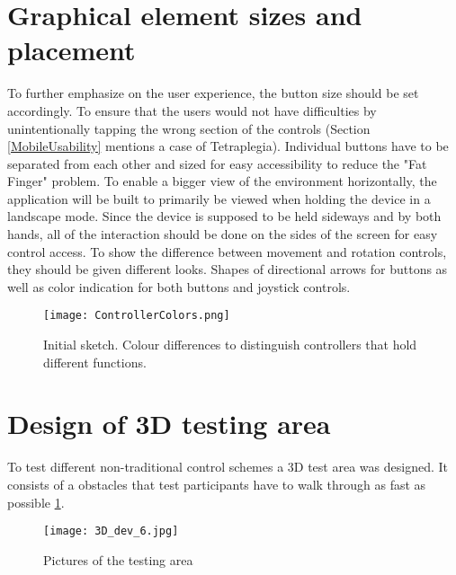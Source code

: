 \section{Graphical element sizes and placement}
To further emphasize on the user experience, the button size should be set accordingly. To ensure that the users would not have difficulties by unintentionally tapping the wrong section of the controls (Section \ref{MobileUsability} mentions a case of Tetraplegia). Individual buttons have to be separated from each other and sized for easy accessibility to reduce the "Fat Finger" problem. To enable a bigger view of the environment horizontally, the application will be built to primarily be viewed when holding the device in a landscape mode. Since the device is supposed to be held sideways and by both hands, all of the interaction should be done on the sides of the screen for easy control access.
To show the difference between movement and rotation controls, they should be given different looks. Shapes of directional arrows for buttons as well as color indication for both buttons and joystick controls.

\begin{figure}[H]
\centering
\texttt{[image: ControllerColors.png]}
\caption{Initial sketch. Colour differences to distinguish controllers that hold different functions.}
\end{figure}

\section{Design of 3D testing area}
To test different non-traditional control schemes a 3D test area was designed. It consists of a obstacles that test participants have to walk through as fast as possible \ref{TestLevels}.

\begin{figure}[H]
\centering
\texttt{[image: 3D\_dev\_6.jpg]}
\caption{Pictures of the testing area}
\label{TestLevels}
\end{figure}

